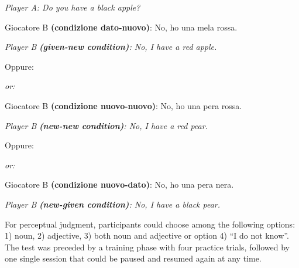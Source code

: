 \begin{styleTextbody}
\textit{Player A: Do you have a black apple?}
\end{styleTextbody}

\begin{styleTextbody}
Giocatore B \textbf{(condizione dato-nuovo)}: No, ho una mela rossa.
\end{styleTextbody}

\begin{styleTextbody}
\textit{Player B }\textbf{\textit{(given-new condition)}}\textit{: No, I have a red apple.}
\end{styleTextbody}

\begin{styleTextbody}
Oppure:
\end{styleTextbody}

\begin{styleTextbody}
\textit{or:}
\end{styleTextbody}

\begin{styleTextbody}
Giocatore B \textbf{(condizione nuovo-nuovo)}: No, ho una pera rossa.
\end{styleTextbody}

\begin{styleTextbody}
\textit{Player B }\textbf{\textit{(new-new condition)}}\textit{: No, I have a red pear.}
\end{styleTextbody}

\begin{styleTextbody}
Oppure:
\end{styleTextbody}

\begin{styleTextbody}
\textit{or:}
\end{styleTextbody}

\begin{styleTextbody}
Giocatore B \textbf{(condizione nuovo-dato)}: No, ho una pera nera.
\end{styleTextbody}

\begin{styleTextbody}
\textit{Player B}\textbf{\textit{ (new-given condition)}}\textit{: No, I have a black pear.}
\end{styleTextbody}

\begin{styleStandard}
For perceptual judgment, participants could choose among the following options: 1) noun, 2) adjective, 3) both noun and adjective or option 4) “I do not know”. The test was preceded by a training phase with four practice trials, followed by one single session that could be paused and resumed again at any time.
\end{styleStandard}

